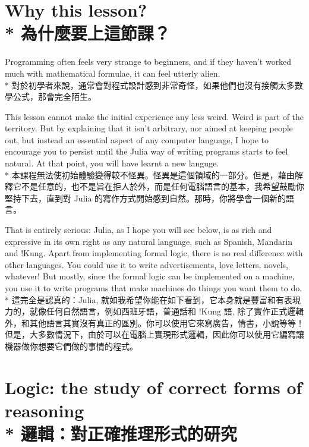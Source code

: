 \documentclass[]{article}
\begin{document}
\section*{{\color{gray}Why this lesson?}
\\*
{為什麼要上這節課？}}

{\color{gray}Programming often feels very strange to beginners, and if they haven't worked much with mathematical formulae, it can feel utterly alien.}
\\*
{對於初學者來說，通常會對程式設計感到非常奇怪，如果他們也沒有接觸太多數學公式，那會完全陌生。}

{\color{gray}This lesson cannot make the initial experience any less weird. Weird is part of the territory. But by explaining that it isn't arbitrary, nor aimed at keeping people out, but instead an essential aspect of any computer language, I hope to encourage you to persist until the Julia way of writing programs starts to feel natural. At that point, you will have learnt a new {\color{cyan}languge}.}
\\*
{本課程無法使初始體驗變得較不怪異。怪異是這個領域的一部分。但是，藉由解釋它不是任意的，也不是旨在拒人於外，而是任何電腦語言的基本，我希望鼓勵你堅持下去，直到對 Julia 的寫作方式開始感到自然。那時，你將學會一個新的語言。}

{\color{gray}That is entirely serious: Julia, as I hope you will see below, is as rich and expressive in its own right as any natural language, such as Spanish, Mandarin and !Kung. Apart from implementing formal logic, there is no real difference with other languages. You could use it to write advertisements, love letters, novels, whatever! But mostly, since the formal logic can be implemented on a machine,  you use it to write programs that make machines do things you want them to do.}
\\*
{這完全是認真的：Julia, 就如我希望你能在如下看到，它本身就是豐富和有表現力的，就像任何自然語言，例如西班牙語，普通話和{ }!Kung 語, 除了實作正式邏輯外，和其他語言其實沒有真正的區別。你可以使用它來寫廣告，情書，小說等等！但是，大多數情況下，由於可以在電腦上實現形式邏輯，因此你可以使用它編寫讓機器做你想要它們做的事情的程式。}

\section*{{\color{gray}Logic: the study of correct forms of reasoning} 
\\*
{邏輯：對正確推理形式的研究}}		
\end{document}
